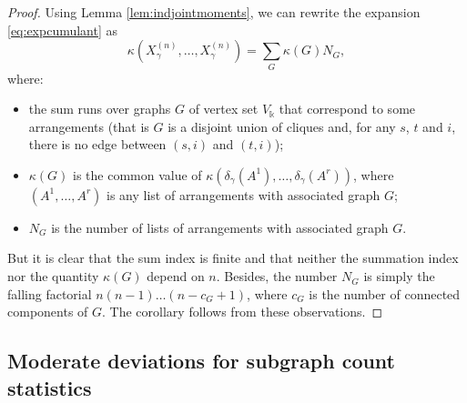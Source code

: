 \documentclass[12pt,a4paper,reqno]{amsart}
\theoremstyle{remark}
\newcommand{\SubGraph}{X^{(n)}}
\begin{document}
\begin{proof}
Using Lemma \ref{lem:indjointmoments}, we can rewrite the expansion \eqref{eq:expcumulant} as
\begin{equation}
    \kappa(\SubGraph_{\gamma},\dots,\SubGraph_{\gamma}) = \sum_G \kappa(G) N_G,
    \label{eq:expansioncumulantgraphs}
\end{equation}
where:\vspace{2mm}
\begin{itemize}
    \item the sum runs over graphs $G$ of vertex set $V_\Bbbk$ that correspond to some arrangements (that is $G$ is a disjoint union of cliques and, for any $s$, $t$ and $i$, there is no edge between $(s,i)$ and $(t,i)$);\vspace{2mm}
    \item $\kappa(G)$ is the common value of $\kappa\left( \delta_{\gamma}(A^1), \dots, \delta_{\gamma}(A^r) \right)$, where $(A^1,\dots,A^r)$ is any list of arrangements with associated graph $G$;\vspace{2mm}
    \item $N_G$ is the number of lists of arrangements with associated graph $G$.\vspace{2mm}
\end{itemize}
But it is clear that the sum index is finite and that neither the summation index nor the quantity $\kappa(G)$ depend on $n$. Besides, the number $N_G$ is simply the falling factorial $n(n-1)\dots(n-c_G+1)$, where $c_G$ is the number of connected components of $G$. The corollary follows from these observations.
\end{proof}
\bigskip



\subsection{Moderate deviations for subgraph count statistics}
\end{document}
